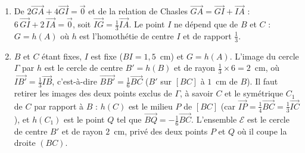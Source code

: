 \begin{corrige}
\begin{sol}
\begin{enumerate}
\begin{itemize}
      \item $G = \mathrm{bar}\{(K,5);(C,1)\}$, donc $G\in(CK)$ et $\overrightarrow{CG} = \frac{5}{6}\overrightarrow{CK}$.
      \end{itemize}
      Les trois droites passent par $G$ : elles sont concourantes en $G$.
\item De $2\overrightarrow{GA} + 4\overrightarrow{GI} = \vec{0}$ et de la relation de Chasles $\overrightarrow{GA} = \overrightarrow{GI} + \overrightarrow{IA}$ :
      $6\,\overrightarrow{GI} + 2\,\overrightarrow{IA} = \vec{0}$, soit $\overrightarrow{IG} = \frac{1}{3}\overrightarrow{IA}$.
      Le point $I$ ne d\'epend que de $B$ et $C$ : $G = h(A)$ o\`u $h$ est l'homoth\'etie de centre $I$ et de rapport $\frac{1}{3}$.
\item $B$ et $C$ \'etant fixes, $I$ est fixe ($BI = 1{,}5$~cm) et $G = h(A)$.
      L'image du cercle $\Gamma$ par $h$ est le cercle de centre $B' = h(B)$ et de rayon $\frac{1}{3}\times 6 = 2$~cm,
      o\`u $\overrightarrow{IB'} = \frac{1}{3}\overrightarrow{IB}$, c'est-\`a-dire $\overrightarrow{BB'} = \frac{1}{6}\overrightarrow{BC}$ ($B'$ sur $[BC]$ \`a $1$~cm de $B$).
      Il faut retirer les images des deux points exclus de $\Gamma$, \`a savoir $C$ et le sym\'etrique $C_1$ de $C$ par rapport \`a $B$ :
      $h(C)$ est le milieu $P$ de $[BC]$ (car $\overrightarrow{IP} = \frac{1}{4}\overrightarrow{BC} = \frac{1}{3}\overrightarrow{IC}$), et $h(C_1)$ est le point $Q$ tel que
      $\overrightarrow{BQ} = -\frac{1}{6}\overrightarrow{BC}$.
      L'ensemble $\mathcal{E}$ est le cercle de centre $B'$ et de rayon $2$~cm, priv\'e des deux points $P$ et $Q$ o\`u il coupe la droite $(BC)$.
\end{enumerate}
\end{sol}
\end{corrige}
